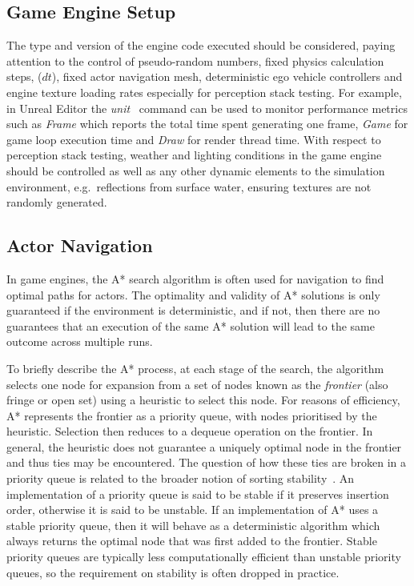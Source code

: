 \subsection{Game Engine Setup}
The type and version of the engine code executed should be considered, paying attention to the control of pseudo-random numbers, fixed physics calculation steps, ($dt$), fixed actor navigation mesh, deterministic ego vehicle controllers and engine texture loading rates especially for perception stack testing. 
%
For example, in Unreal Editor the \textit{unit}~\cite{stat_commands} command can be used to monitor performance metrics such as \textit{Frame} which reports the total time spent generating one frame, \textit{Game} for game loop execution time and \textit{Draw} for render thread time. 
%
With respect to perception stack testing, weather and lighting conditions in the game engine should be controlled as well as any other dynamic elements to the simulation environment, e.g.\ reflections from surface water, ensuring textures are not randomly generated. 

\subsection{Actor Navigation}
%
In game engines, the A* search algorithm is often used for navigation to find optimal paths for actors. 
%
The optimality and validity of A* solutions is only guaranteed if the environment is deterministic, and if not, then there are no guarantees that an execution of the same A* solution will lead to the same outcome across multiple runs. 

To briefly describe the A* process, at each stage of the search, the algorithm selects one node for expansion from a set of nodes known as the \textit{frontier} (also fringe or open set) using a heuristic to select this node. For reasons of efficiency, A* represents the frontier as a priority queue, with nodes prioritised by the heuristic. Selection then reduces to a dequeue operation on the frontier. In general, the heuristic does not guarantee a uniquely optimal node in the frontier and thus ties may be encountered. The question of how these ties are broken in a priority queue is related to the broader notion of sorting stability~\cite{Sedgewick2011}. An implementation of a priority queue is said to be stable if it preserves insertion order, otherwise it is said to be unstable. If an implementation of A* uses a stable priority queue, then it will behave as a deterministic algorithm which always returns the optimal node that was first added to the frontier. Stable priority queues are typically less computationally efficient than unstable priority queues, so the requirement on stability is often dropped in practice. 

